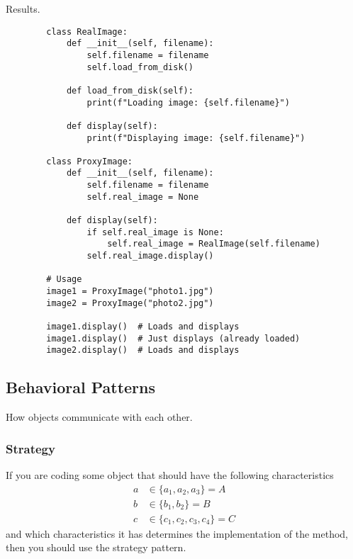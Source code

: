     Results. 

    \begin{example}
      \begin{lstlisting}
        class RealImage:
            def __init__(self, filename):
                self.filename = filename
                self.load_from_disk()
            
            def load_from_disk(self):
                print(f"Loading image: {self.filename}")
            
            def display(self):
                print(f"Displaying image: {self.filename}")

        class ProxyImage:
            def __init__(self, filename):
                self.filename = filename
                self.real_image = None
            
            def display(self):
                if self.real_image is None:
                    self.real_image = RealImage(self.filename)
                self.real_image.display()

        # Usage
        image1 = ProxyImage("photo1.jpg")
        image2 = ProxyImage("photo2.jpg")

        image1.display()  # Loads and displays
        image1.display()  # Just displays (already loaded)
        image2.display()  # Loads and displays 
      \end{lstlisting}
    \end{example}

\subsection{Behavioral Patterns} 

  How objects communicate with each other. 

  \subsubsection{Strategy} 

    If you are coding some object that should have the following characteristics 
    \begin{align}
      a & \in \{a_1, a_2, a_3\} = A \\
      b & \in \{b_1, b_2\} = B \\
      c & \in \{c_1, c_2, c_3, c_4\} = C
    \end{align}
    and which characteristics it has determines the implementation of the method, then you should use the strategy pattern.


